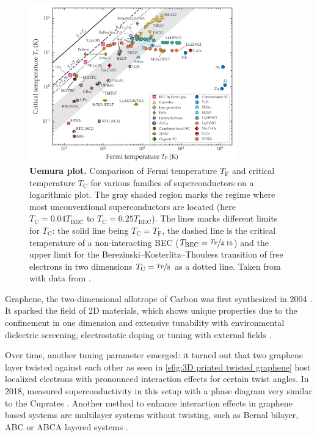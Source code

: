 \documentclass[../notes.tex]{subfiles}
\begin{document}
\begin{figure}[t]
	\centering
	\includegraphics[width=0.8\textwidth]{images/Uemura plot Niklas.png}
	\caption[Uemura plot.]{\textbf{Uemura plot.} 
		Comparison of Fermi temperature \(T_{\mathrm{F}}\) and critical temperature \(T_{\mathrm{C}}\) for various families of superconductors on a logarithmic plot.
		The gray shaded region marks the regime where most unconventional superconductors are located (here \(T_{\mathrm{C}} = 0.04 T_{\mathrm{BEC}}\) to \(T_{\mathrm{C}} = 0.25 T_{\mathrm{BEC}}\)).
		The lines marks different limits for \(T_{\mathrm{C}}\): the solid line being \(T_{\mathrm{C}} = T_{\mathrm{F}}\), the dashed line is the critical temperature of a non-interacting BEC (\(T_{\mathrm{BEC}} = \nicefrac{T_{\mathrm{F}}}{4.16}\)) and the upper limit for the Berezinski–Kosterlitz–Thouless transition of free electrons in two dimensions \(T_{\mathrm{C}} = \nicefrac{T_{\mathrm{F}}}{8}\) as a dotted line.
		Taken from \cite{wittElectronCorrelationsUnconventional} with data from  \cite{nakagawaGatecontrolledBCSBECCrossover2021, uemuraDynamicSuperconductivityResponses2019, pantaleonSuperconductivityCorrelatedPhases2023a}.
	}
	\label{fig:Uemura plot}
\end{figure}

Graphene, the two-dimensional allotrope of Carbon was first synthesized in 2004 \cite{novoselovElectricFieldEffect2004}.
It sparked the field of 2D materials, which shows unique properties due to the confinement in one dimension and extensive tunability with environmental dielectric screening, electrostatic doping or tuning with external fields \cite{geimVanWaalsHeterostructures2013}.

Over time, another tuning parameter emerged: it turned out that two graphene layer twisted against each other as seen in \cref{sfig:3D printed twisted graphene} host localized electrons with pronounced interaction effects for certain twist angles.
In 2018, \citeauthor{caoUnconventionalSuperconductivityMagicangle2018} measured superconductivity in this setup with a phase diagram very similar to the Cuprates \cite{caoUnconventionalSuperconductivityMagicangle2018}.
Another method to enhance interaction effects in graphene based systems are multilayer systems without twisting, such as Bernal bilayer, ABC or ABCA layered systems \cite{pantaleonSuperconductivityCorrelatedPhases2023}.
\end{document}
